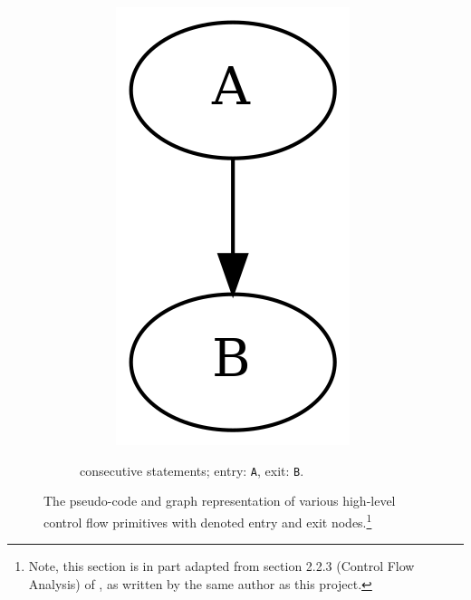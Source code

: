 \begin{savenotes}
\begin{figure}[htbp]
\begin{subfigure}[ht]{0.24\textwidth}
\begin{subfigure}[ht]{0.35\textwidth}
				\includegraphics[width=\textwidth]{inc/primitives/seq.png}
			\end{subfigure}
			\caption{consecutive statements; entry: \texttt{A}, exit: \texttt{B}.}
			\label{fig:seq_graph_representation}
		\end{subfigure}
		\caption{The pseudo-code and graph representation of various high-level control flow primitives with denoted entry and exit nodes.\protect\footnote{Note, this section is in part adapted from section 2.2.3 (Control Flow Analysis) of \cite{compositional_decompilation}, as written by the same author as this project.}}
		\label{fig:graph_representations}
	\end{figure}
\end{savenotes}

